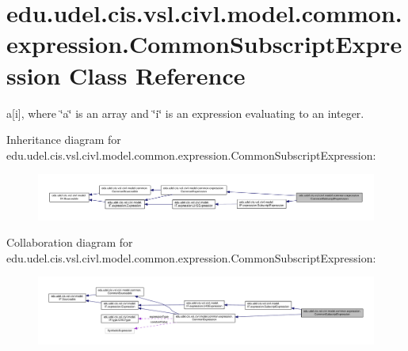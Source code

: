 \hypertarget{classedu_1_1udel_1_1cis_1_1vsl_1_1civl_1_1model_1_1common_1_1expression_1_1CommonSubscriptExpression}{}\section{edu.\+udel.\+cis.\+vsl.\+civl.\+model.\+common.\+expression.\+Common\+Subscript\+Expression Class Reference}
\label{classedu_1_1udel_1_1cis_1_1vsl_1_1civl_1_1model_1_1common_1_1expression_1_1CommonSubscriptExpression}


a\mbox{[}i\mbox{]}, where \char`\"{}a\char`\"{} is an array and \char`\"{}i\char`\"{} is an expression evaluating to an integer.  




Inheritance diagram for edu.\+udel.\+cis.\+vsl.\+civl.\+model.\+common.\+expression.\+Common\+Subscript\+Expression\+:
\nopagebreak
\begin{figure}[H]
\begin{center}
\leavevmode
\includegraphics[width=350pt]{classedu_1_1udel_1_1cis_1_1vsl_1_1civl_1_1model_1_1common_1_1expression_1_1CommonSubscriptExpression__inherit__graph}
\end{center}
\end{figure}


Collaboration diagram for edu.\+udel.\+cis.\+vsl.\+civl.\+model.\+common.\+expression.\+Common\+Subscript\+Expression\+:
\nopagebreak
\begin{figure}[H]
\begin{center}
\leavevmode
\includegraphics[width=350pt]{classedu_1_1udel_1_1cis_1_1vsl_1_1civl_1_1model_1_1common_1_1expression_1_1CommonSubscriptExpression__coll__graph}
\end{center}
\end{figure}
